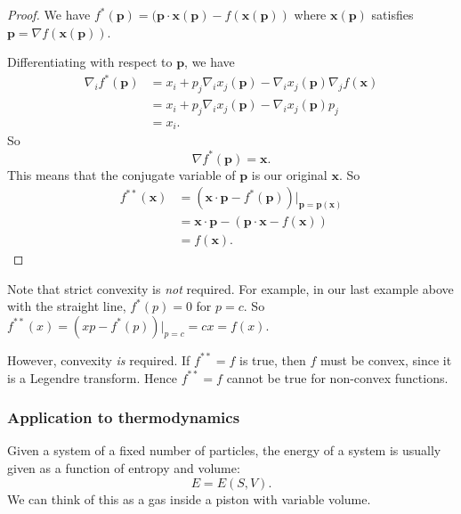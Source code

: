 \documentclass[a4paper]{article}
\begin{document}
\begin{proof}
  We have $f^*(\mathbf{p}) = (\mathbf{p}\cdot\mathbf{x}(\mathbf{p}) - f(\mathbf{x}(\mathbf{p}))$ where $\mathbf{x}(\mathbf{p})$ satisfies $\mathbf{p} = \nabla f(\mathbf{x}(\mathbf{p}))$.

  Differentiating with respect to $\mathbf{p}$, we have
  \begin{align*}
    \nabla_i f^*(\mathbf{p}) &= x_i + p_j \nabla_i x_j (\mathbf{p}) - \nabla_i x_j(\mathbf{p}) \nabla_j f(\mathbf{x})\\
    &= x_i + p_j \nabla_i x_j(\mathbf{p}) - \nabla_i x_j(\mathbf{p}) p_j\\
    &= x_i.
  \end{align*}
  So
  \[
    \nabla f^*(\mathbf{p}) = \mathbf{x}.
  \]
  This means that the conjugate variable of $\mathbf{p}$ is our original $\mathbf{x}$. So
  \begin{align*}
    f^{**}(\mathbf{x}) &= (\mathbf{x} \cdot \mathbf{p} - f^*(\mathbf{p}))|_{\mathbf{p} = \mathbf{p}(\mathbf{x})}\\
    &= \mathbf{x}\cdot \mathbf{p} - (\mathbf{p}\cdot \mathbf{x} - f(\mathbf{x}))\\
    &= f(\mathbf{x}).
  \end{align*}
\end{proof}
Note that strict convexity is \emph{not} required. For example, in our last example above with the straight line, $f^*(p) = 0$ for $p = c$. So $f^{**}(x) = (xp - f^*(p))|_{p = c} = cx = f(x)$.

However, convexity \emph{is} required. If $f^{**} = f$ is true, then $f$ must be convex, since it is a Legendre transform. Hence $f^{**} = f$ cannot be true for non-convex functions.

\subsubsection*{Application to thermodynamics}
Given a system of a fixed number of particles, the energy of a system is usually given as a function of entropy and volume:
\[
  E = E(S, V).
\]
We can think of this as a gas inside a piston with variable volume.
\end{document}
